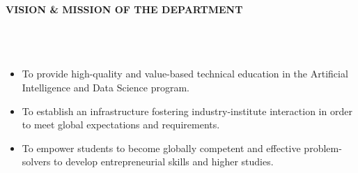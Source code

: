 {}
\fancyhead{}
\fancyfoot{}

\renewcommand{\footrulewidth}{0pt}
\renewcommand{\headrulewidth}{0pt}
\newcommand{\wideunderline}[2][2em]{%
  \underline{\makebox[\ifdim\width>#1\width\else#1\fi]{#2}}%
}
\begin{center}
 \vspace*{1cm}
    \Large \textbf{ VISION \& MISSION OF THE DEPARTMENT}
     \vspace*{2.0cm}
    \\ {\Large \bf \wideunderline[12em]{Vision}}
    \\ \vspace{1.0cm}{
    \large To achieve excellence in Artificial Intelligence and Data Science to cater \\to the ever-changing industrial and socio-economic needs.}
 \vspace*{2.0cm}
    \\ {\Large \bf \wideunderline  [12em]{Mission}}
    \\ \vspace{1.0cm}
  \begin{itemize}
    \item \large To provide high-quality and value-based technical education in the Artificial Intelligence and Data Science program.
    \item \large To establish an infrastructure fostering industry-institute interaction in order to meet global expectations and requirements.
    \item \large To empower students to become globally competent and effective problem-solvers to develop entrepreneurial skills and higher studies.
  \end{itemize}
\end{center}